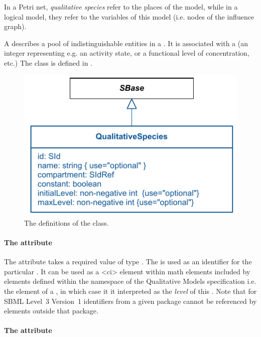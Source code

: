 In a Petri net, {\em qualitative species} refer to the places of the model, while in a logical model, they refer to the variables of this model (i.e. nodes of the influence graph).

A \QualitativeSpecies describes a pool of indistinguishable entities in a . It is associated with  a  (an integer representing e.g. an activity state, or a functional level of concentration, etc.)  %
 The \QualitativeSpecies class is defined in .
\begin{figure}[h]
  \includegraphics{figs/qual-qualitative-species-uml.pdf}
  \caption{The definitions of the \QualitativeSpecies class. }
  \label{qual-qualitative-species-uml}
\end{figure}

\paragraph{The \fixttspace{} attribute}

The  attribute takes a required value
of type . The  is used as an identifier for the particular \QualitativeSpecies. It can be used as a 
<ci> element within math elements included by elements defined within the namespace of the Qualitative Models specification i.e. the  element of a \FunctionTerm, in which case it it interpreted as the \emph{level} of this \QualitativeSpecies. Note that for SBML Level~3 Version~1 identifiers from a given package cannot be referenced by elements outside that package. 

\paragraph{The \fixttspace{} attribute}


